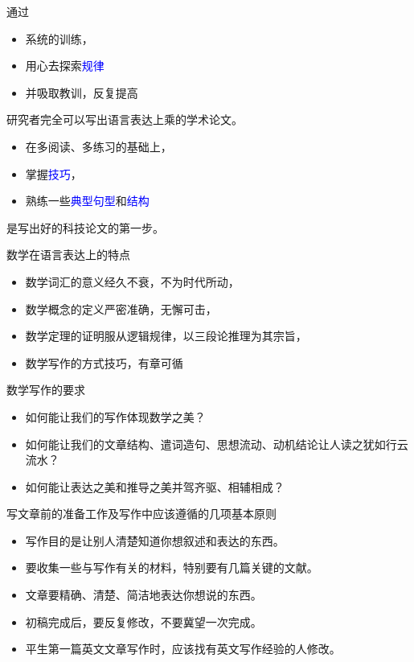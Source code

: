 \documentclass[12pt]{ctexbeamer}
\newcommand{\blue}[1]{\textcolor{blue}{#1}}
\begin{document}
\begin{frame}
	通过
		\begin{itemize}
		\item  系统的训练，
		\item 用心去探索\blue{规律}
		\item 并吸取教训，反复提高
	\end{itemize}
研究者完全可以写出语言表达上乘的学术论文。


\vspace{15pt}

\begin{itemize}
	\item 在多阅读、多练习的基础上，
	\item 掌握\blue{技巧}，
	\item 熟练一些\blue{典型句型}和\blue{结构}
\end{itemize}
是写出好的科技论文的第一步。
\end{frame}


\begin{frame}
	数学在语言表达上的特点
	\begin{itemize}
		\item 数学词汇的意义经久不衰，不为时代所动，
		\item 数学概念的定义严密准确，无懈可击，
		\item 数学定理的证明服从逻辑规律，以三段论推理为其宗旨，
		\item 数学写作的方式技巧，有章可循
	\end{itemize}
\vspace{15pt}
\pause
	数学写作的要求
\begin{itemize}
	\item 如何能让我们的写作体现数学之美？
	\item 如何能让我们的文章结构、遣词造句、思想流动、动机结论让人读之犹如行云流水？
	\item 如何能让表达之美和推导之美并驾齐驱、相辅相成？
\end{itemize}
\end{frame}




\begin{frame}
	写文章前的准备工作及写作中应该遵循的几项基本原则
	\begin{itemize}
		\item  写作目的是让别人清楚知道你想叙述和表达的东西。
		\item 要收集一些与写作有关的材料，特别要有几篇关键的文献。
		\item 文章要精确、清楚、简洁地表达你想说的东西。
		\item 初稿完成后，要反复修改，不要冀望一次完成。
		\item 平生第一篇英文文章写作时，应该找有英文写作经验的人修改。
	\end{itemize}
\end{frame}
\end{document}
